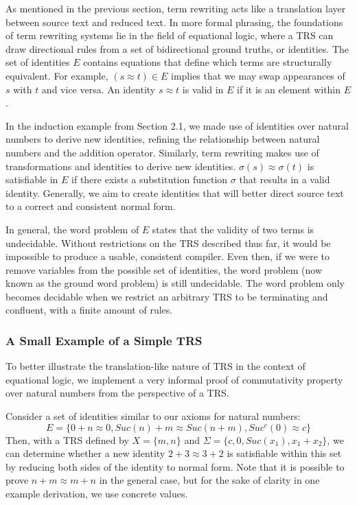 \documentclass{article}
\begin{document}
As mentioned in the previous section, term rewriting acts like a translation layer between source text and reduced text.
In more formal phrasing, the foundations of term rewriting systems lie in the field of equational logic,
where a TRS can draw directional rules from a set of bidirectional ground truths, or identities. The set of identities $E$
contains equations that define which terms are structurally equivalent. For example, $(s \approx t) \in E$ implies that
we may swap appearances of $s$ with $t$ and vice versa. An identity $s \approx t$ is valid in $E$ if it is an element within $E$.

In the induction example from Section 2.1,
we made use of identities over natural numbers to derive new identities, refining the relationship between natural numbers and the addition operator.
Similarly, term rewriting makes use of transformations and identities to derive new identities. $\sigma(s) \approx \sigma(t)$ is satisfiable in $E$ if
there exists a substitution function $\sigma$ that results in a valid identity. Generally, we aim to create identities that will better direct source text
to a correct and consistent normal form.

In general, the word problem of $E$ states that the validity of two terms is undecidable.
Without restrictions on the TRS described thus far,
it would be impossible to produce a usable, consistent compiler.
Even then, if we were to remove variables from the possible set of identities,
the word problem (now known as the ground word problem) is still undecidable.
The word problem only becomes decidable when we restrict an arbitrary TRS to be terminating and confluent, with a finite amount of rules.


\subsubsection{A Small Example of a Simple TRS}

To better illustrate the translation-like nature of TRS in the context of equational logic, we implement a very informal proof of commutativity property
over natural numbers from the perspective of a TRS.

Consider a set of identities similar to our axioms for natural numbers:
\[E = \{0 + n \approx 0, Suc(n) + m \approx Suc(n + m), Suc^c(0) \approx c\}\]
Then, with a TRS defined by $X = \{m,n\}$ and $\Sigma = \{c,0, Suc(x_1), x_1 + x_2\}$,
we can determine whether a new identity $2 + 3 \approx 3 + 2$
is satisfiable within this set by reducing both sides of the identity to normal form.
Note that it is possible to prove $n + m \approx m + n$ in the general case, but for the sake of clarity in one example derivation,
we use concrete values.
\end{document}

